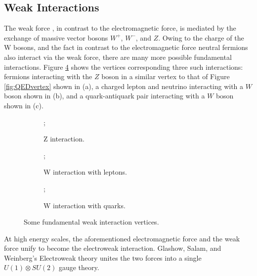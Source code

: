 \subsection{Weak Interactions}
The weak force \cite{pdg_rev,glashow,goldstone_weinberg_salam,weinberg}, in contrast to the electromagnetic force, is mediated by the exchange of massive vector bosons $W^+$, $W^-$, and $Z$. Owing to the charge of the W bosons, and the fact in contrast to the electromagnetic force neutral fermions also interact via the weak force, there are many more possible fundamental interactions. Figure \ref{fig:EWVertices} shows the vertices corresponding three such interactions: fermions interacting with the $Z$ boson in a similar vertex to that of Figure \ref{fig:QEDvertex} shown in (a), a charged lepton and neutrino interacting with a $W$ boson shown in (b), and a quark-antiquark pair interacting with a $W$ boson shown in (c).

\begin{figure}[h!]
    \begin{subfigure}{.5\textwidth}
        \centering
        ;
        \caption{Z interaction.}
        \label{fig:EWvertexa}
    \end{subfigure}
    \begin{subfigure}{.5\textwidth}
        \centering
        ;
        \caption{W interaction with leptons.}
        \label{fig:EWVertexb}
    \end{subfigure}
    \newline
    \begin{subfigure}{1\textwidth}
        \centering
        ;
        \caption{W interaction with quarks.}
        \label{fig:EWVertexc}
    \end{subfigure}
    \caption{Some fundamental weak interaction vertices.}
    \label{fig:EWVertices}
\end{figure}

At high energy scales, the aforementioned electromagnetic force and the weak force unify to become the electroweak interaction. Glashow, Salam, and Weinberg's Electroweak theory unites the two forces into a single $U(1) \otimes SU(2)$ gauge theory.

